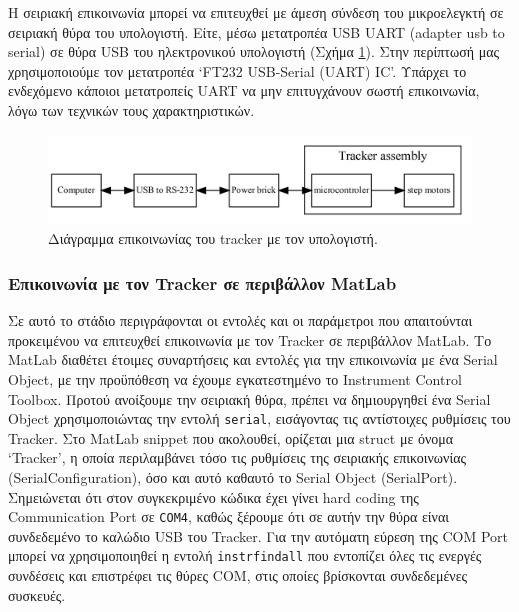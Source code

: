 \documentclass[
  a4paper,
  twoside,
  titlepage,
  12pt]{article}
\numberwithin{equation}{section}
\numberwithin{figure}{section}
\numberwithin{table}{section}
\begin{document}
Η σειριακή επικοινωνία μπορεί να επιτευχθεί με άμεση σύνδεση του μικροελεγκτή σε σειριακή θύρα του υπολογιστή. Είτε, μέσω μετατροπέα USB UART (adapter usb to serial) σε θύρα USB του ηλεκτρονικού υπολογιστή (Σχήμα \ref{fig:trackercon}). Στην περίπτωσή μας χρησιμοποιούμε τον μετατροπέα `FT232 USB-Serial (UART) IC'. Υπάρχει το ενδεχόμενο κάποιοι μετατροπείς UART να μην επιτυγχάνουν σωστή επικοινωνία, λόγω των τεχνικών τους χαρακτηριστικών.

\begin{figure}

{\centering \includegraphics[width=0.8\linewidth]{figure/trackercon} 

}

\caption{Διάγραμμα επικοινωνίας του tracker με τον υπολογιστή.}\label{fig:trackercon}
\end{figure}

\hypertarget{tracker_matlab}{%
\subsubsection{Επικοινωνία με τον Tracker σε περιβάλλον MatLab}\label{tracker_matlab}}

Σε αυτό το στάδιο περιγράφονται οι εντολές και οι παράμετροι που απαιτούνται προκειμένου να επιτευχθεί επικοινωνία με τον Tracker σε περιβάλλον MatLab. Το MatLab διαθέτει έτοιμες συναρτήσεις και εντολές για την επικοινωνία με ένα Serial Object, με την προϋπόθεση να έχουμε εγκατεστημένο το Instrument Control Toolbox. Προτού ανοίξουμε την σειριακή θύρα, πρέπει να δημιουργηθεί ένα Serial Object χρησιμοποιώντας την εντολή \texttt{serial}, εισάγοντας τις αντίστοιχες ρυθμίσεις του Tracker. Στο MatLab snippet που ακολουθεί, ορίζεται μια struct με όνομα `Tracker', η οποία περιλαμβάνει τόσο τις ρυθμίσεις της σειριακής επικοινωνίας (SerialConfiguration), όσο και αυτό καθαυτό το Serial Object (SerialPort). Σημειώνεται ότι στον συγκεκριμένο κώδικα έχει γίνει hard coding της Communication Port σε \texttt{COM4}, καθώς ξέρουμε ότι σε αυτήν την θύρα είναι συνδεδεμένο το καλώδιο USB του Tracker. Για την αυτόματη εύρεση της COM Port μπορεί να χρησιμοποιηθεί η εντολή \texttt{instrfindall} που εντοπίζει όλες τις ενεργές συνδέσεις και επιστρέφει τις θύρες COM, στις οποίες βρίσκονται συνδεδεμένες συσκευές.
\end{document}
